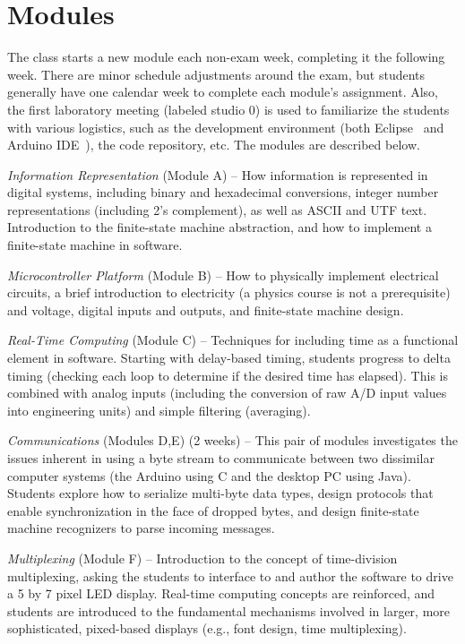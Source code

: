 \section{Modules}
\label{sec:weeks}

The class starts a new module each
non-exam week, completing it the following week. There are minor schedule
adjustments around the exam, but students generally have one calendar week
to complete each module's assignment.
Also, the first laboratory meeting (labeled studio 0) is used to familiarize
the students with various logistics, such as the development environment
(both Eclipse~\cite{eclipse} and Arduino IDE~\cite{arduino}),
the code repository, etc.
The modules are described below.

\emph{Information Representation} (Module A) --
How information is represented in digital systems, including binary and
hexadecimal conversions, integer
number representations (including 2's complement), as well as
ASCII and UTF text.
Introduction to the finite-state machine abstraction,
and how to implement a finite-state machine in software.

\emph{Microcontroller Platform} (Module B) --
How to physically implement electrical
circuits, a brief introduction to electricity (a physics course is not a
prerequisite) and voltage, digital inputs and outputs, and finite-state
machine design.

\emph{Real-Time Computing} (Module C) --
Techniques for including time as a functional
element in software. Starting with delay-based timing, students progress to delta
timing (checking each loop to determine if the desired time has elapsed).
This is combined with analog inputs (including the conversion of raw A/D
input values into engineering units) and simple filtering (averaging).

\emph{Communications} (Modules D,E) (2 weeks) --
This pair of modules investigates the issues inherent in using a byte stream
to communicate between two dissimilar computer systems (the Arduino using C
and the desktop PC using Java).  Students explore how
to serialize multi-byte data types, design protocols that enable synchronization
in the face of dropped bytes,
and design finite-state machine recognizers to parse incoming messages.

\emph{Multiplexing} (Module F) --
Introduction to the concept of time-division multiplexing, asking the
students to interface to and author the software to drive a 5 by 7 pixel
LED display. Real-time computing concepts are reinforced, and students
are introduced to the fundamental mechanisms involved in larger, more
sophisticated, pixed-based displays (e.g., font design, time multiplexing).

